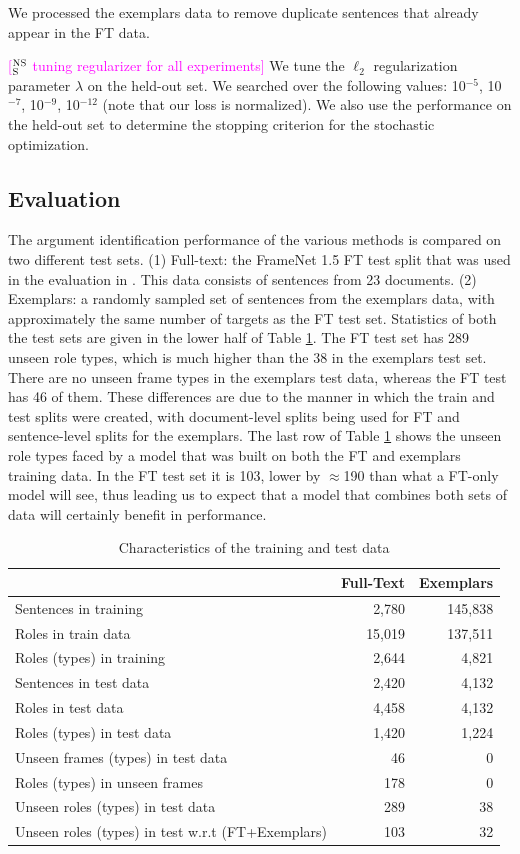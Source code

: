 \documentclass[11pt,a4paper]{article}
\newcommand{\ensuretext}[1]{#1}
\newcommand{\nssmarker}{\ensuretext{\textcolor{magenta}{\ensuremath{^{\textsc{NS}}_{\textsc{S}}}}}}
\newcommand{\arkcomment}[3]{\ensuretext{\textcolor{#3}{[#1 #2]}}}
\newcommand{\nss}[1]{\arkcomment{\nssmarker}{#1}{magenta}}
\begin{document}
We processed the exemplars data to remove duplicate sentences that already appear in the FT data. 



\nss{tuning regularizer for all experiments}
We tune the $\ell_2$ regularization parameter $\lambda$ on the held-out set. We searched over the following
values: 10$^{-5}$, 10$^{-7}$, 10$^{-9}$, 10$^{-12}$ (note that our loss is normalized).
We also use the performance on the held-out set to determine the stopping criterion for the stochastic optimization.




\subsection{Evaluation}
The argument identification performance of the various methods is compared on two different test sets.
(1) Full-text: the FrameNet 1.5 FT test split that was used in the evaluation in \cite{das-14}. This data consists of sentences from 23 documents. 
(2) Exemplars: a randomly sampled set of sentences from the exemplars data, with approximately the same number of targets as the FT test set.
Statistics of both the test sets are given in the lower half of Table \ref{tbl:datastats}. 
The FT test set has 289 unseen role types, which is much higher than
the 38 in the exemplars test set. There are no unseen frame types in the exemplars test data, whereas the FT test has 46 of them. 
These differences are due to the manner in which the train and test splits were created, with document-level splits being used
for FT and sentence-level splits for the exemplars.
The last row of Table \ref{tbl:datastats} shows the unseen role types faced by a model that was built on both the FT and exemplars training data.
In the FT test set it is 103, lower by $\approx$190 than what a FT-only model will see, thus leading us to expect that a model that combines
both sets of data will certainly benefit in performance.


\begin{table}\centering\small
\begin{tabular}{p{4cm}rr}
\toprule
\normalfont & \textbf{Full-Text} & \textbf{Exemplars} \\
\midrule
Sentences in training & 2,780 & 145,838 \\
Roles in train data & 15,019 & 137,511 \\
Roles (types) in training & 2,644 & 4,821 \\
Sentences in test data & 2,420 & 4,132 \\
Roles in test data & 4,458 & 4,132 \\
Roles (types) in test data & 1,420 & 1,224 \\
Unseen frames (types) in test data & 46 & 0 \\
Roles (types) in unseen frames & 178 & 0 \\
Unseen roles (types) in test data & 289 & 38 \\
Unseen roles (types) in test w.r.t (FT+Exemplars) & 103 & 32 \\
\end{tabular}
\caption{Characteristics of the training and test data}
\label{tbl:datastats}
\end{table}
\end{document}
